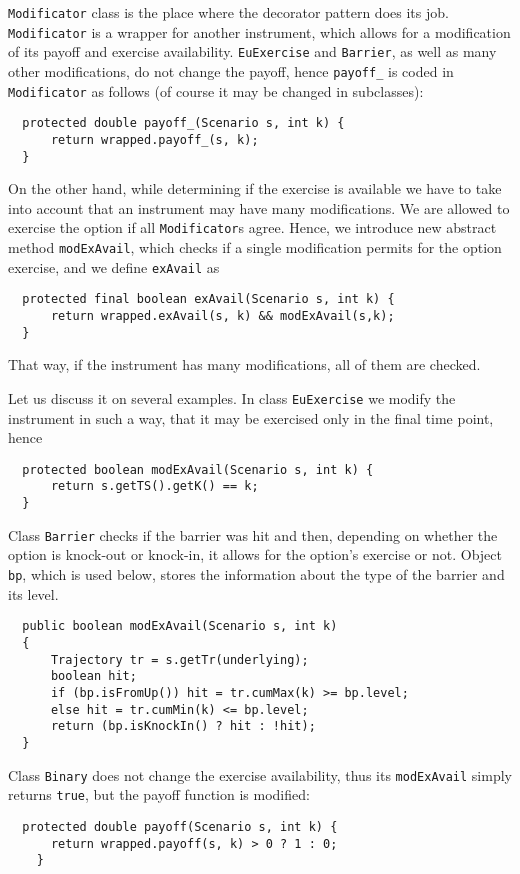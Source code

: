 \documentclass[a4paper,11pt, twoside]{book}
\newenvironment{absolutelynopagebreak}
  {\par\nobreak\vfill\penalty0\vfilneg
   \vtop\bgroup}
  {\par\xdef\tpd{\the\prevdepth}\egroup
   \prevdepth=\tpd}
\theoremstyle{definition}
\theoremstyle{remark}
\newcounter{example}[chapter]
\begin{document}
\texttt{Modificator} class is the place where the decorator pattern does its job. \texttt{Modificator} is a wrapper for another instrument, which allows for a modification of its payoff and exercise availability. \texttt{EuExercise} and \texttt{Barrier}, as well as many other modifications, do not change the payoff, hence \texttt{payoff\_} is coded in \texttt{Modificator} as follows (of course it may be changed in subclasses):
\begin{lstlisting}
  protected double payoff_(Scenario s, int k) {
      return wrapped.payoff_(s, k);
  }
\end{lstlisting}
On the other hand, while determining if the exercise is available we have to take into account that an instrument may have many modifications. We are allowed to exercise the option if all \texttt{Modificator}s agree. Hence, we introduce new abstract method \texttt{modExAvail}, which checks if a single modification permits for the option exercise, and we define \texttt{exAvail} as
\begin{lstlisting}
  protected final boolean exAvail(Scenario s, int k) {
      return wrapped.exAvail(s, k) && modExAvail(s,k);
  }
\end{lstlisting}
That way, if the instrument has many modifications, all of them are checked.

Let us discuss it on several examples. In class \texttt{EuExercise} we modify the instrument in such a way, that it may be exercised only in the final time point, hence
\begin{lstlisting}
  protected boolean modExAvail(Scenario s, int k) {
      return s.getTS().getK() == k;
  }
\end{lstlisting}
Class \texttt{Barrier} checks if the barrier was hit and then, depending on whether the option is knock-out or knock-in, it allows for the option's exercise or not. Object \texttt{bp}, which is used below, stores the information about the type of the barrier and its level.
\begin{lstlisting}
  public boolean modExAvail(Scenario s, int k)
  {
      Trajectory tr = s.getTr(underlying);
      boolean hit;
      if (bp.isFromUp()) hit = tr.cumMax(k) >= bp.level;
      else hit = tr.cumMin(k) <= bp.level;
      return (bp.isKnockIn() ? hit : !hit);
  }
\end{lstlisting}

Class \texttt{Binary} does not change the exercise availability, thus its \texttt{modExAvail} simply returns \texttt{true}, but the payoff function is modified:
\begin{lstlisting}
  protected double payoff(Scenario s, int k) {
      return wrapped.payoff(s, k) > 0 ? 1 : 0;
    }
\end{lstlisting}
	
\end{document}
